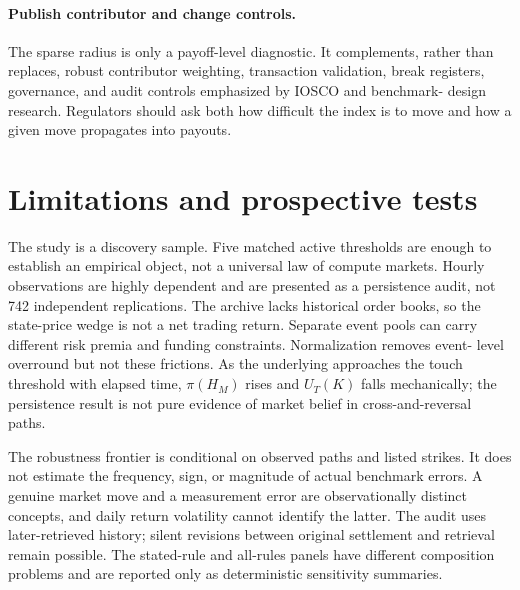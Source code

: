 \documentclass[10pt,twocolumn]{article}
\begin{document}
\paragraph{Publish contributor and change controls.}
The sparse radius is only a payoff-level diagnostic. It complements, rather
than replaces, robust contributor weighting, transaction validation, break
registers, governance, and audit controls emphasized by IOSCO and benchmark-
design research. Regulators should ask both how difficult the index is to move
and how a given move propagates into payouts.

\section{Limitations and prospective tests}

The study is a discovery sample. Five matched active thresholds are enough to
establish an empirical object, not a universal law of compute markets. Hourly
observations are highly dependent and are presented as a persistence audit, not
742 independent replications. The archive lacks historical order books, so the
state-price wedge is not a net trading return. Separate event pools can carry
different risk premia and funding constraints. Normalization removes event-
level overround but not these frictions. As the underlying approaches the
touch threshold with elapsed time, $\pi(H_M)$ rises and $U_T(K)$ falls
mechanically; the persistence result is not pure evidence of market belief
in cross-and-reversal paths.

The robustness frontier is conditional on observed paths and listed strikes.
It does not estimate the frequency, sign, or magnitude of actual benchmark
errors. A genuine market move and a measurement error are observationally
distinct concepts, and daily return volatility cannot identify the latter.
The audit uses later-retrieved history; silent revisions between original
settlement and retrieval remain possible. The stated-rule and all-rules panels
have different composition problems and are reported only as deterministic
sensitivity summaries.
\end{document}
